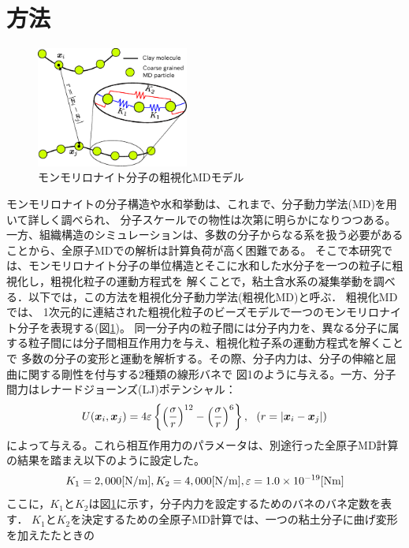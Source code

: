 ﻿\documentclass[11pt,a4j]{jarticle}
\begin{document}
\section{方法}
\begin{figure}
	\centering
	\includegraphics[keepaspectratio,width=50mm]{Figs/cg_model.eps}
	\caption{モンモリロナイト分子の粗視化MDモデル}
	\label{fig:fig1}
\end{figure}
モンモリロナイトの分子構造や水和挙動は、これまで、分子動力学法(MD)を用いて詳しく調べられ、
分子スケールでの物性は次第に明らかになりつつある\cite{Kawamura}。
一方、組織構造のシミュレーションは、多数の分子からなる系を扱う必要があることから、全原子MDでの解析は計算負荷が高く困難である。
そこで本研究では、モンモリロナイト分子の単位構造とそこに水和した水分子を一つの粒子に粗視化し，粗視化粒子の運動方程式を
解くことで，粘土含水系の凝集挙動を調べる．以下では，この方法を粗視化分子動力学法(粗視化MD)と呼ぶ．
粗視化MDでは、 1次元的に連結された粗視化粒子のビーズモデルで一つのモンモリロナイト分子を表現する(図\ref{fig:fig1})。
同一分子内の粒子間には分子内力を、異なる分子に属する粒子間には分子間相互作用力を与え、粗視化粒子系の運動方程式を解くことで
多数の分子の変形と運動を解析する。その際、分子内力は、分子の伸縮と屈曲に関する剛性を付与する2種類の線形バネで
図1のように与える。一方、分子間力はレナードジョーンズ(LJ)ポテンシャル：
\begin{equation}
	U(\mbox{\boldmath $x$}_i,\mbox{\boldmath $x$}_j)=4\varepsilon
	\left\{ \left(\frac{\sigma}{r}\right)^{12}-
	\left( \frac{\sigma}{r}\right)^6\right\}, 
	\ \ \left(r=\left| \mbox{\boldmath $x$}_i-\mbox{\boldmath $x$}_j\right|\right)
	\label{eqn:LJ}
\end{equation}
によって与える。これら相互作用力のパラメータは、別途行った全原子MD計算の結果を踏まえ以下のように設定した。
\begin{equation}
	K_1  = 2,000[{\rm N / m}],   K_2  = 4,000[{\rm N / m}],  \varepsilon = 1.0\times10^{-19}     [{\rm Nm}]
	\label{eqn:prms}
\end{equation}
ここに，$K_1$と$K_2$は図\ref{fig:fig1}に示す，分子内力を設定するためのバネのバネ定数を表す．
$K_1$と$K_2$を決定するための全原子MD計算では、一つの粘土分子に曲げ変形を加えたたときの
\end{document}
